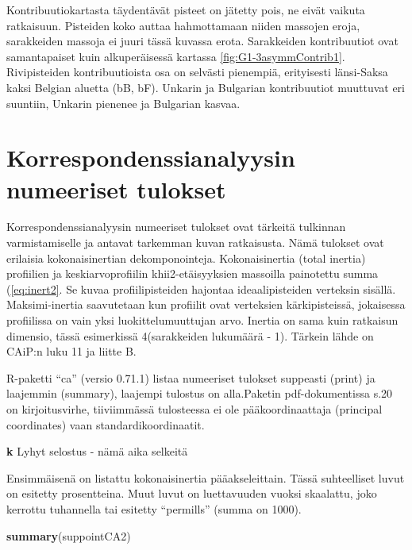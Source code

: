 \documentclass[
  finnish,
]{book}
\newenvironment{Shaded}{\begin{snugshade}}{\end{snugshade}}
\newcommand{\KeywordTok}[1]{\textcolor[rgb]{0.13,0.29,0.53}{\textbf{#1}}}
\newcommand{\NormalTok}[1]{#1}
\begin{document}
Kontribuutiokartasta täydentävät pisteet on jätetty pois, ne eivät vaikuta ratkaisuun.
Pisteiden koko auttaa hahmottamaan niiden massojen eroja, sarakkeiden massoja ei
juuri tässä kuvassa erota. Sarakkeiden kontribuutiot ovat samantapaiset kuin
alkuperäisessä kartassa \ref{fig:G1-3asymmContrib1}. Rivipisteiden kontribuutioista
osa on selvästi pienempiä, erityisesti länsi-Saksa kaksi Belgian aluetta (bB, bF).
Unkarin ja Bulgarian kontribuutiot muuttuvat eri suuntiin, Unkarin pienenee ja
Bulgarian kasvaa.

\hypertarget{korrespondenssianalyysin-numeeriset-tulokset}{%
\section{Korrespondenssianalyysin numeeriset tulokset}\label{korrespondenssianalyysin-numeeriset-tulokset}}

Korrespondenssianalyysin numeeriset tulokset ovat tärkeitä tulkinnan varmistamiselle
ja antavat tarkemman kuvan ratkaisusta. Nämä tulokset ovat erilaisia kokonaisinertian
dekomponointeja. Kokonaisinertia (total inertia) profiilien ja keskiarvoprofiilin
khii2-etäisyyksien massoilla painotettu summa (\eqref{eq:inert2}. Se kuvaa
profiilipisteiden hajontaa ideaalipisteiden verteksin sisällä. Maksimi-inertia
saavutetaan kun profiilit ovat verteksien kärkipisteissä, jokaisessa profiilissa
on vain yksi luokittelumuuttujan arvo. Inertia on sama kuin ratkaisun dimensio,
tässä esimerkissä 4(sarakkeiden lukumäärä - 1). Tärkein lähde on CAiP:n luku 11
ja liitte B.

R-paketti ``ca'' (versio 0.71.1) listaa numeeriset tulokset suppeasti (print) ja laajemmin
(summary), laajempi tulostus on alla.Paketin pdf-dokumentissa s.20 on kirjoitusvirhe, tiiviimmässä
tulosteessa ei ole pääkoordinaattaja (principal coordinates) vaan standardikoordinaatit.

\textbf{k} Lyhyt selostus - nämä aika selkeitä

Ensimmäisenä on listattu kokonaisinertia pääakseleittain. Tässä suhteelliset luvut
on esitetty prosentteina. Muut luvut on luettavuuden vuoksi skaalattu, joko kerrottu
tuhannella tai esitetty ``permills'' (summa on 1000).

\begin{Shaded}
\begin{Highlighting}[]
\KeywordTok{summary}\NormalTok{(suppointCA2)}
\end{Highlighting}
\end{Shaded}
\end{document}
